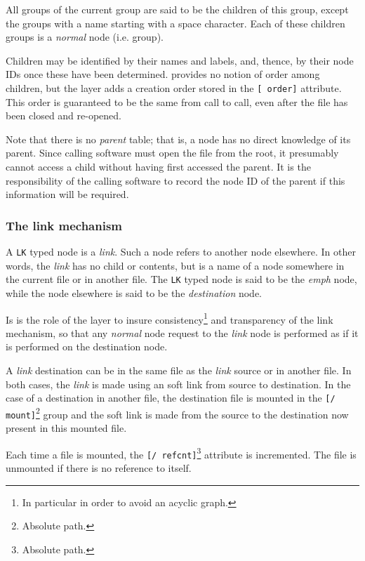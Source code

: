 All groups of the current group are said to be the children of this group,
except the groups with a name starting with a space character. Each of
these children groups is a \emph{normal} node (i.e. group).

Children may be identified by their names and labels, and, thence,
by their node IDs once these have been determined. \HDF provides no
notion of order among children, but the \SLL layer adds a creation order
stored in the \texttt{[ order]} attribute. This order is guaranteed to
be the same from call to call, even after the file has been closed and
re-opened.


Note that there is no \emph{parent} table; that is, a node has no direct
knowledge of its parent. Since calling software must open the file
from the root, it presumably cannot access a child without having
first accessed the parent.  It is the responsibility of the calling
software to record the node ID of the parent if this information will be
required.

\subsubsection{The link mechanism}
\label{s:linkmechs}

A \texttt{LK} typed node is a \emph{link}. Such a node refers to
another node elsewhere. In other words, the \emph{link} has no child
or contents, but is a name of a node somewhere in the current file or
in another file.  The \texttt{LK} typed node is said to be the
\emph{emph} node, while the node elsewhere is said to be the
\emph{destination} node.

Is is the role of the \SLL layer to insure consistency\footnote{In
particular in order to avoid an acyclic graph.} and
transparency of the link mechanism, so that any \emph{normal} node
request to the \emph{link} node is performed as if it is performed
on the destination node.

A \emph{link} destination can be in the same file as the \emph{link} source
or in another file. In both cases, the \emph{link} is made using an \HDF
soft link from source to destination. In the case of a destination in another
file, the destination file is mounted in the \texttt{[/ mount]}\footnote{Absolute path.} group and
the soft link is made from the source to the destination now present in
this mounted file. 

Each time a file is mounted, the \texttt{[/ refcnt]}\footnote{Absolute path.}
attribute is incremented.
The file is unmounted if there is no reference to itself.


